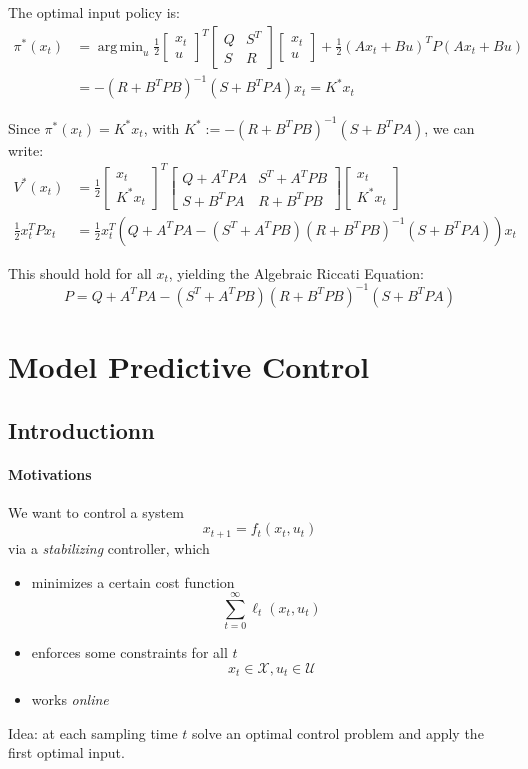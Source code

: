 \documentclass[openany]{book}
\DeclareMathOperator*{\argmin}{arg\,min}  %
\theoremstyle{definition}
\theoremstyle{remark}
\begin{document}
The optimal input policy is:
\begin{align*}
\pi^*(x_t) &= \argmin_u \frac{1}{2}\begin{bmatrix}
x_t \\ u
\end{bmatrix}^T \begin{bmatrix}
Q & S^T \\ S & R
\end{bmatrix} \begin{bmatrix}
x_t \\ u
\end{bmatrix} + \frac{1}{2}(Ax_t + Bu)^T P(Ax_t + Bu)\\
&= -(R + B^T PB)^{-1}(S + B^T PA)x_t = K^*x_t
\end{align*}

Since $\pi^*(x_t) = K^*x_t$, with $K^* := -(R + B^T PB)^{-1}(S + B^T PA)$, we can write:
\begin{align*}
V^*(x_t) &= \frac{1}{2}\begin{bmatrix}
x_t \\ K^*x_t
\end{bmatrix}^T \begin{bmatrix}
Q + A^T PA & S^T + A^T PB\\
S + B^T PA & R + B^T PB
\end{bmatrix} \begin{bmatrix}
x_t \\ K^*x_t
\end{bmatrix}\\
\frac{1}{2}x_t^T Px_t &= \frac{1}{2}x_t^T(Q + A^T PA - (S^T + A^T PB)(R + B^T PB)^{-1}(S + B^T PA))x_t
\end{align*}

This should hold for all $x_t$, yielding the Algebraic Riccati Equation:
\[
P = Q + A^T PA - (S^T + A^T PB)(R + B^T PB)^{-1}(S + B^T PA)
\]

\chapter{Model Predictive Control}
\section{Introductionn}
\subsubsection{Motivations}
We want to control a system 
\[
    x_{t+1} = f_t(x_t,u_t)
\]
via a \emph{stabilizing} controller, which
\begin{itemize}
    \item minimizes a certain cost function \[
            \displaystyle\sum_{t=0}^{\infty}\ell_t(x_t,u_t)
        \]
    \item enforces some constraints for all $t$ 
        \[
            x_t \in \mathcal{X}, u_t \in \mathcal{U}
        \]
    \item works \emph{online}
\end{itemize}
Idea: at each sampling time $t$ solve an optimal control problem and apply the first optimal input.
\end{document}
